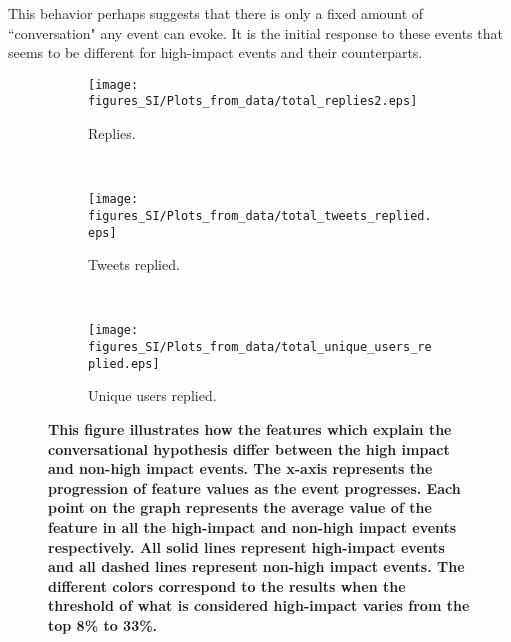 This behavior perhaps suggests that there is only a fixed amount of
``conversation" any event can evoke. It is the initial response to
these events that seems to be different for high-impact events and
their counterparts.
\begin{figure}
  \centering
  \begin{subfigure}[b]{0.45\textwidth}
    \texttt{[image: figures\_SI/Plots\_from\_data/total\_replies2.eps]}
    \caption{Replies.} \label{fig:feat_replies}
  \end{subfigure}
  ~ %
  \begin{subfigure}[b]{0.45\textwidth}
    \texttt{[image: figures\_SI/Plots\_from\_data/total\_tweets\_replied.eps]}
    \caption{Tweets replied.} \label{fig:feat_tweets_replied}
  \end{subfigure} ~ %

  \begin{subfigure}[b]{0.45\textwidth}
    \texttt{[image: figures\_SI/Plots\_from\_data/total\_unique\_users\_replied.eps]}
    \caption{Unique users
      replied.} \label{fig:feat_uniq_users_replied}
  \end{subfigure}
  \caption{\textbf{This figure illustrates how the features which
      explain the conversational hypothesis differ between the high
      impact and non-high impact events. The x-axis represents the
      progression of feature values as the event progresses. Each
      point on the graph represents the average value of the feature
      in all the high-impact and non-high impact events respectively.
      All solid lines represent high-impact events and all dashed
      lines represent non-high impact events. The different colors
      correspond to the results when the threshold of what is
      considered high-impact varies from the top 8\% to 33\%. }}
  \label{fig:conversational_hypothesis}
\end{figure}

